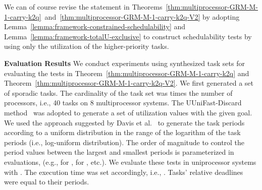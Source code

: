 \documentclass[10pt,conference]{IEEEtran}
\begin{document}
We can of course revise the statement in
Theorems~\ref{thm:multiprocessor-GRM-M-1-carry-k2q}~and~\ref{thm:multiprocessor-GRM-M-1-carry-k2q-V2}
by adopting Lemma~\ref{lemma:framework-constrained-schedulability} and
Lemma~\ref{lemma:framework-totalU-exclusive} to construct
schedulability tests by using only the utilization of the higher-priority tasks.


{\bf Evaluation Results} We conduct experiments using synthesized task
sets for evaluating the tests in
Theorem~\ref{thm:multiprocessor-GRM-M-1-carry-k2q} and
Theorem~\ref{thm:multiprocessor-GRM-M-1-carry-k2q-V2}.  We first
generated a set of sporadic tasks. The cardinality of the task set was
 times the number of processors, i.e., 40 tasks on 8 multiprocessor
systems.  The UUniFast-Discard method~\cite{davis2011improved} was
adopted to generate a set of utilization values with the given goal.
We used the approach suggested by Davis et
al.~\cite{davis2008efficient} to generate the task periods according
to a uniform distribution in the range of the logarithm of the task periods (i.e.,
log-uniform distribution).  The order of magnitude  to
control the period values between the largest and smallest periods is
parameterized in evaluations, (e.g.,  for ,  for
, etc.).  We evaluate these tests in uniprocessor systems with .  The execution time
was set accordingly, i.e., .  Tasks' relative deadlines
were equal to their periods.
\end{document}
